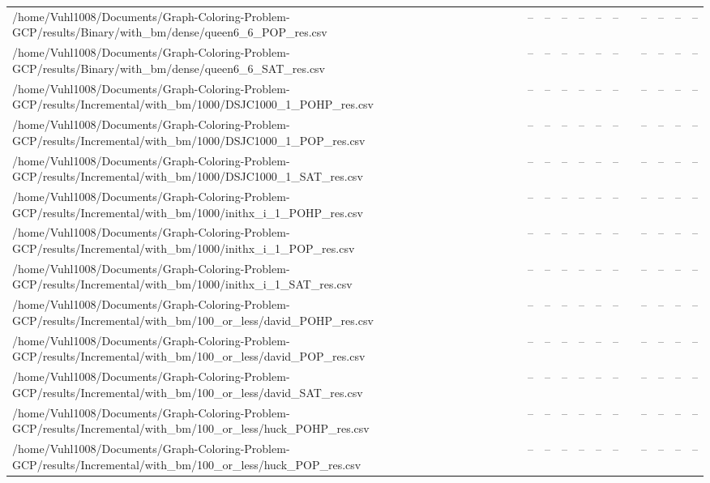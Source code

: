 \begin{table}[htbp]
\begin{tabular}{llllllllllll}
/home/Vuhl1008/Documents/Graph-Coloring-Problem-GCP/results/Binary/with\_bm/dense/queen6\_6\_POP\_res.csv & -- & -- & -- & -- & -- & -- & {} & -- & -- & -- & -- \\
/home/Vuhl1008/Documents/Graph-Coloring-Problem-GCP/results/Binary/with\_bm/dense/queen6\_6\_SAT\_res.csv & -- & -- & -- & -- & -- & -- & {} & -- & -- & -- & -- \\
/home/Vuhl1008/Documents/Graph-Coloring-Problem-GCP/results/Incremental/with\_bm/1000/DSJC1000\_1\_POHP\_res.csv & -- & -- & -- & -- & -- & -- & {} & -- & -- & -- & -- \\
/home/Vuhl1008/Documents/Graph-Coloring-Problem-GCP/results/Incremental/with\_bm/1000/DSJC1000\_1\_POP\_res.csv & -- & -- & -- & -- & -- & -- & {} & -- & -- & -- & -- \\
/home/Vuhl1008/Documents/Graph-Coloring-Problem-GCP/results/Incremental/with\_bm/1000/DSJC1000\_1\_SAT\_res.csv & -- & -- & -- & -- & -- & -- & {} & -- & -- & -- & -- \\
/home/Vuhl1008/Documents/Graph-Coloring-Problem-GCP/results/Incremental/with\_bm/1000/inithx\_i\_1\_POHP\_res.csv & -- & -- & -- & -- & -- & -- & {} & -- & -- & -- & -- \\
/home/Vuhl1008/Documents/Graph-Coloring-Problem-GCP/results/Incremental/with\_bm/1000/inithx\_i\_1\_POP\_res.csv & -- & -- & -- & -- & -- & -- & {} & -- & -- & -- & -- \\
/home/Vuhl1008/Documents/Graph-Coloring-Problem-GCP/results/Incremental/with\_bm/1000/inithx\_i\_1\_SAT\_res.csv & -- & -- & -- & -- & -- & -- & {} & -- & -- & -- & -- \\
/home/Vuhl1008/Documents/Graph-Coloring-Problem-GCP/results/Incremental/with\_bm/100\_or\_less/david\_POHP\_res.csv & -- & -- & -- & -- & -- & -- & {} & -- & -- & -- & -- \\
/home/Vuhl1008/Documents/Graph-Coloring-Problem-GCP/results/Incremental/with\_bm/100\_or\_less/david\_POP\_res.csv & -- & -- & -- & -- & -- & -- & {} & -- & -- & -- & -- \\
/home/Vuhl1008/Documents/Graph-Coloring-Problem-GCP/results/Incremental/with\_bm/100\_or\_less/david\_SAT\_res.csv & -- & -- & -- & -- & -- & -- & {} & -- & -- & -- & -- \\
/home/Vuhl1008/Documents/Graph-Coloring-Problem-GCP/results/Incremental/with\_bm/100\_or\_less/huck\_POHP\_res.csv & -- & -- & -- & -- & -- & -- & {} & -- & -- & -- & -- \\
/home/Vuhl1008/Documents/Graph-Coloring-Problem-GCP/results/Incremental/with\_bm/100\_or\_less/huck\_POP\_res.csv & -- & -- & -- & -- & -- & -- & {} & -- & -- & -- & -- \\

\end{tabular}
\end{table}
